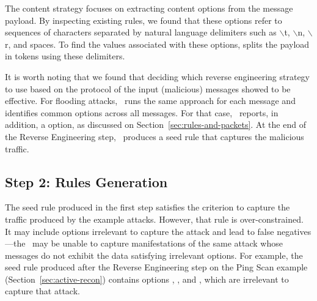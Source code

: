 \documentclass[conference]{IEEEtran}
\begin{document}
The content strategy focuses on extracting content options from the
message payload. By inspecting existing rules, we found that these
options refer to sequences of characters separated by natural language
delimiters such as $\backslash$t, $\backslash$n, $\backslash$r, and
spaces. To find the values associated with these options, \tname{}
splits the payload in tokens using these delimiters.


It is worth noting that we found that deciding which reverse
engineering strategy to use based on the protocol of the input
(malicious) messages showed to be effective. For
flooding attacks, \tname\ runs the same approach for each message and
identifies common options across all messages. For that case,
\tname\ reports, in addition, a  option, as
discussed on Section~\ref{sec:rules-and-packets}.  At the end of the
Reverse Engineering step, \tname\ produces a seed rule that captures
the malicious traffic.





\subsection{Step 2: Rules Generation}
\label{sec:minimization}

The seed rule produced in the first step satisfies the criterion to
capture the traffic produced by the example attacks. However, that
rule is over-constrained.  It may include options irrelevant to
capture the attack and lead to false negatives---the \nids\ may be
unable to capture manifestations of the same attack whose messages do
not exhibit the data satisfying irrelevant options. For example, the
seed rule produced after the Reverse Engineering step on the Ping Scan
example (Section~\ref{sec:active-recon}) contains options
, , and
, which are irrelevant to capture that attack.
\end{document}

